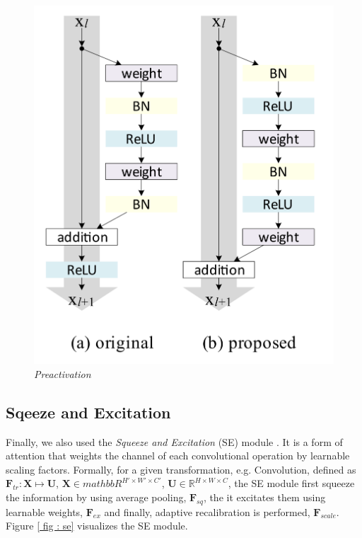 \documentclass[../document.tex]{subfiles}
\begin{document}
\begin{figure}[htbp]
    \centering
    \includegraphics[scale=0.2]{../img/implementation/estimator/preactivation.png}
    \caption{\emph{Preactivation} \cite{he2015identity}}
\end{figure}
\subsection{Sqeeze and Excitation}
Finally, we also used the \emph{Squeeze and Excitation} (SE) module \cite{hu2017squeeze}. It is a form of attention that weights the channel of each convolutional operation by learnable scaling factors. Formally, for a given transformation, e.g. Convolution, defined as $\bm{F}_{tr}  : \bm{X} \mapsto \bm{U}$, $\bm{X} \in mathbb{R}^{H' \times W' \times C'}$, $\bm{U} \in \mathbb{R}^{H \times W \times C}$, the SE module first squeeze the information by using average pooling, $\bm{F}_{sq}$, the it excitates them using learnable weights, $\bm{F}_{ex}$ and finally, adaptive recalibration is performed, $\bm{F}_{scale}$.
Figure \ref{ fig : se} visualizes the SE module.
\end{document}
